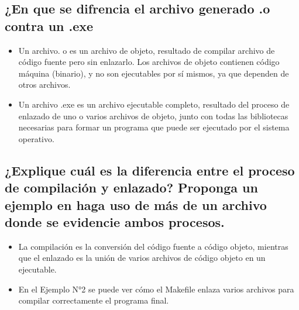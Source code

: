 \documentclass[]{article}
\begin{document}
        \subsection{¿En que se difrencia el archivo generado .o contra un .exe}

        \begin{itemize}
            \item Un archivo. o es un archivo de objeto, resultado de compilar archivo de código fuente pero sin enlazarlo. Los archivos de objeto contienen código máquina (binario), y no son ejecutables por sí mismos, ya que dependen de otros archivos.
            \item Un archivo .exe es un archivo ejecutable completo, resultado del proceso  de enlazado de uno o varios archivos de objeto, junto con todas las bibliotecas necesarias para formar un programa que puede ser ejecutado por el sistema operativo.
        \end{itemize}
        
        \subsection{¿Explique cuál es la diferencia entre el proceso de compilación y enlazado? Proponga un ejemplo en haga uso de más de un archivo donde se evidencie ambos procesos.}
        \begin{itemize}
            \item La compilación es la conversión del código fuente a código objeto, mientras que el enlazado es la unión de varios archivos de código objeto en un ejecutable.
            \item En el Ejemplo N°2 se puede ver cómo el Makefile enlaza varios archivos para compilar correctamente el programa final.
        \end{itemize}
        
        \clearpage
\end{document}
